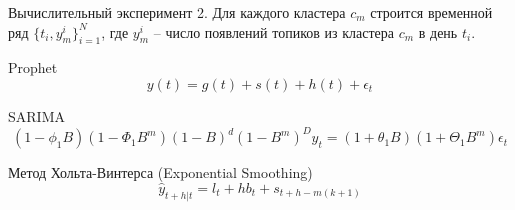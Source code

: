\documentclass{beamer}
\begin{document}
\begin{frame}{Вычислительный эксперимент}
2. Для каждого кластера $c_m$ строится временной ряд $\{t_i, y_m^i\}_{i=1}^N$, где $y_m^i$ -- число появлений топиков из кластера $c_m$ в день $t_i$.


Prophet
\begin{equation}
y(t) = g(t) + s(t) + h(t) + \epsilon_t
\end{equation}

SARIMA
\begin{equation}
(1-\phi_1 B) (1-\Phi_1 B^m)(1-B)^d(1-B^m)^D y_t = (1+\theta_1 B) (1+\Theta_1 B^m)\epsilon_t
\end{equation}

Метод Хольта-Винтерса (Exponential Smoothing)
\begin{equation}
\hat{y}_{t+h|t} = l_t + h b_t + s_{t+h-m(k+1)}
\end{equation}


\end{frame}






\end{document}
